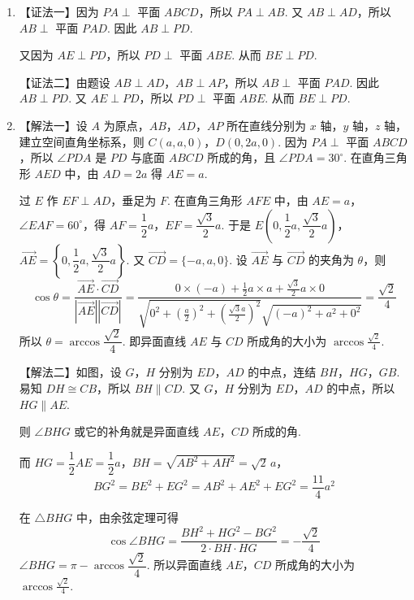 \begin{solution}
\begin{enumerate}
\item 【证法一】因为 \(PA\perp\) 平面 \(ABCD\)，所以 \(PA\perp AB\). 又 \(AB\perp AD\)，所以 \(AB\perp\) 平面 \(PAD\). 因此 \(AB\perp PD\).

又因为 \(AE\perp PD\)，所以 \(PD\perp\) 平面 \(ABE\). 从而 \(BE\perp PD\).

【证法二】由题设 \(AB\perp AD\)，\(AB\perp AP\)，所以 \(AB\perp\) 平面 \(PAD\). 因此 \(AB\perp PD\). 又 \(AE\perp PD\)，所以 \(PD\perp\) 平面 \(ABE\). 从而 \(BE\perp PD\).

\item 【解法一】设 \(A\) 为原点，\(AB\)，\(AD\)，\(AP\) 所在直线分别为 \(x\) 轴，\(y\) 轴，\(z\) 轴，建立空间直角坐标系，则 \(C(a,a,0)\)，\(D(0,2a,0)\).
因为 \(PA\perp\) 平面 \(ABCD\)，所以 \(\angle PDA\) 是 \(PD\) 与底面 \(ABCD\) 所成的角，且 \(\angle PDA=30^\circ\). 在直角三角形 \(AED\) 中，由 \(AD=2a\) 得 \(AE=a\).

过 \(E\) 作 \(EF\perp AD\)，垂足为 \(F\). 在直角三角形 \(AFE\) 中，由 \(AE=a\)，\(\angle EAF=60^\circ\)，得 \(AF=\dfrac12a\)，\(EF=\dfrac{\sqrt3}{2}a\).
于是 \(E\left(0,\dfrac12a,\dfrac{\sqrt3}{2}a\right)\)，\(\overrightarrow{AE}=\left\{0,\dfrac12a,\dfrac{\sqrt3}{2}a\right\}\). 又 \(\overrightarrow{CD}=\{-a,a,0\}\).
设 \(\overrightarrow{AE}\) 与 \(\overrightarrow{CD}\) 的夹角为 \(\theta\)，则
\[
\cos\theta=\frac{\overrightarrow{AE}\cdot\overrightarrow{CD}}{\left|\overrightarrow{AE}\right|\left|\overrightarrow{CD}\right|}
=\frac{0\times(-a)+\frac12a\times a+\frac{\sqrt3}{2}a\times0}{\sqrt{0^2+\left(\frac a2\right)^2+\left(\frac{\sqrt3 a}{2}\right)^2}\sqrt{(-a)^2+a^2+0^2}}
=\frac{\sqrt2}{4}
\]
所以 \(\theta=\arccos\dfrac{\sqrt2}{4}\).
即异面直线 \(AE\) 与 \(CD\) 所成角的大小为 \(\arccos\frac{\sqrt2}{4}\).

【解法二】如图，设 \(G\)，\(H\) 分别为 \(ED\)，\(AD\) 的中点，连结 \(BH\)，\(HG\)，\(GB\). 易知 \(DH \cong CB\)，所以 \(BH\parallel CD\). 又 \(G\)，\(H\) 分别为 \(ED\)，\(AD\) 的中点，所以 \(HG\parallel AE\).

则 \(\angle BHG\) 或它的补角就是异面直线 \(AE\)，\(CD\) 所成的角.

而 \(HG=\dfrac12 AE=\dfrac12 a\)，\(BH=\sqrt{AB^2+AH^2}=\sqrt2\,a\)，
\[
BG^2=BE^2+EG^2=AB^2+AE^2+EG^2=\dfrac{11}{4}a^2
\]

在 \(\triangle BHG\) 中，由余弦定理可得
\[
\cos\angle BHG=\frac{BH^2+HG^2-BG^2}{2\cdot BH\cdot HG}=-\frac{\sqrt2}{4}
\]
\(\angle BHG=\pi-\arccos\dfrac{\sqrt2}{4}\).
所以异面直线 \(AE\)，\(CD\) 所成角的大小为 \(\arccos\frac{\sqrt2}{4}\).
\end{enumerate}
\end{solution}

